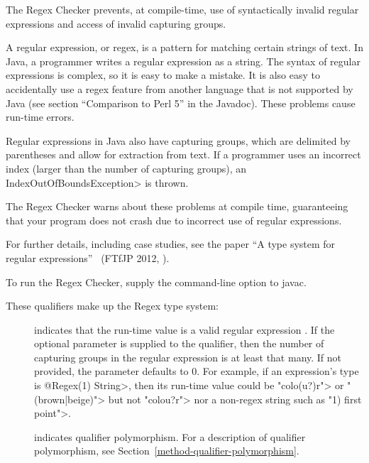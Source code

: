 \htmlhr
{}

The Regex Checker prevents, at compile-time, use of syntactically invalid
regular expressions and access of invalid capturing groups.

A regular expression, or regex, is a pattern for matching certain strings
of text.  In Java, a programmer writes a regular expression as a string.
The syntax of regular expressions is complex, so it is easy to make a
mistake.  It is also easy to accidentally use a regex feature from another
language that is not supported by Java (see section ``Comparison to Perl
5'' in the  Javadoc).
These problems cause run-time errors.

Regular expressions in Java also have capturing groups, which
are delimited by parentheses and allow for extraction from text.
If a programmer uses an incorrect index (larger than the number of
capturing groups), an \<IndexOutOfBoundsException> is thrown.

The Regex Checker warns about these problems at compile time, guaranteeing
that your program does not crash due to incorrect use of regular expressions.

For further details, including case studies, see the paper ``A type system
for regular expressions''~\cite{SpishakDE2012} (FTfJP 2012,
).

To run the Regex Checker, supply the
command-line option to javac.



These qualifiers make up the Regex type system:

\begin{description}

\item[]
  indicates that the run-time value is a valid regular expression
  .  If the optional parameter is supplied to the qualifier,
  then the number of capturing groups in the regular expression is at least
  that many. If not provided, the parameter defaults to 0.
  For example, if an expression's type is \<@Regex(1) String>, then its
  run-time value could be \<"colo(u?)r"> or \<"(brown|beige)"> but not
  \<"colou?r"> nor a non-regex string such as \<"1) first point">.

\item[]
  indicates qualifier polymorphism.
  For a description of qualifier polymorphism, see
  Section~\ref{method-qualifier-polymorphism}.

\end{description}


